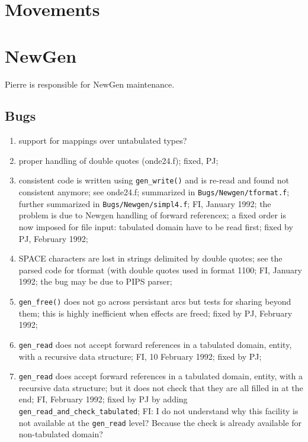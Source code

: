 \section{Movements}

\section{NewGen}

Pierre is responsible for NewGen maintenance.

\subsection{Bugs}

\begin{enumerate}

  \item support for mappings over untabulated types?

  \item proper handling of double quotes (onde24.f); fixed, PJ;

  \item consistent code is written using \verb+gen_write()+ and is re-read
	and found not consistent anymore; see onde24.f; summarized
	in \verb+Bugs/Newgen/tformat.f+; further summarized in
	\verb+Bugs/Newgen/simpl4.f+; FI, January 1992; the problem
	is due to Newgen handling of forward referencex; a fixed order
	is now imposed for file input: tabulated domain have to be
	read first; fixed by PJ, February 1992;

  \item SPACE characters are lost in strings delimited by double quotes;
	see the parsed code for tformat (with double quotes used in
	format 1100; FI, January 1992; the bug may be due to PIPS parser;

  \item \verb+gen_free()+ does not go across persistant arcs but tests for
	sharing beyond them; this is highly inefficient when effects
	are freed; fixed by PJ, February 1992;

  \item \verb+gen_read+ does not accept forward references in a tabulated
	domain, entity, with a recursive data structure; FI, 10 February 1992;
	fixed by PJ;

  \item \verb+gen_read+ does accept forward references in a tabulated
	domain, entity, with a recursive data structure; but it does
	not check that they are all filled in at the end; FI, February 1992;
	fixed by PJ by adding \verb+gen_read_and_check_tabulated+; FI:
	I do not understand why this facility is not available at the
	\verb+gen_read+ level? Because the check is already available for
	non-tabulated domain?


\end{enumerate}
